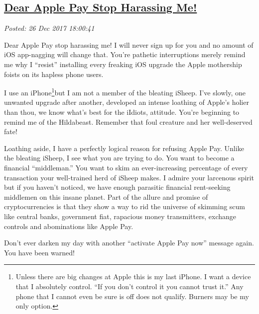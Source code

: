%

\subsection*{\href{http://analyzethedatanotthedrivel.org/2017/12/26/dear-apple-pay-stop-harassing-me/}{Dear Apple Pay Stop Harassing Me!}}


\noindent\emph{Posted: 26 Dec 2017 18:00:41}
\vspace{6pt}

Dear Apple Pay stop harassing me! I will never sign up for you and no
amount of iOS app-nagging will change that. You're pathetic
interruptions merely remind me why I ``resist'' installing every
freaking iOS upgrade the Apple mothership foists on its hapless phone
users.

I use an iPhone\footnote{Unless there are big changes at Apple this is my last iPhone. I want a
  device that I absolutely control. ``If you don't control it you cannot
  trust it.'' Any phone that I cannot even be sure is off does not
  qualify. Burners may be my only option.
}but I am not
a member of the bleating iSheep. I've slowly, one unwanted upgrade after
another, developed an intense loathing of Apple's holier than thou, we
know what's best for the iIdiots, attitude. You're beginning to remind
me of the Hildabeast. Remember that foul creature and her well-deserved
fate!

Loathing aside, I have a perfectly logical reason for refusing Apple
Pay. Unlike the bleating iSheep, I see what you are trying to do. You
want to become a financial ``middleman.'' You want to skim an
ever-increasing percentage of every transaction your well-trained herd
of iSheep makes. I admire your larcenous spirit but if you haven't
noticed, we have enough parasitic financial rent-seeking middlemen on
this insane planet. Part of the allure and promise of cryptocurrencies
is that they show a way to rid the universe of skimming scum like
central banks, government fiat, rapacious money transmitters, exchange
controls and abominations like Apple Pay.

Don't ever darken my day with another ``activate Apple Pay now'' message
again. You have been warned!

%
%
%



%
 
